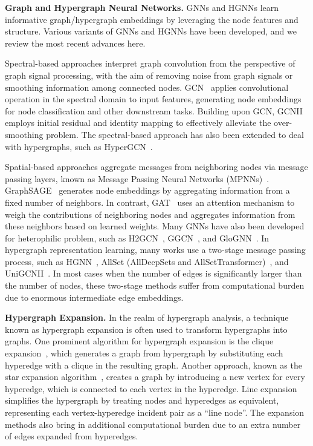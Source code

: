 \documentclass[review]{elsarticle}
\begin{document}
\textbf{Graph and Hypergraph Neural Networks.} GNNs and HGNNs learn informative graph/hypergraph embeddings by leveraging the node features and structure. Various variants of GNNs and HGNNs have been developed, and we review the most recent advances here.

Spectral-based approaches interpret graph convolution from the perspective of graph signal processing, with the aim of removing noise from graph signals or smoothing information among connected nodes. GCN~\cite{kipf2016semi} applies convolutional operation in the spectral domain to input features, generating node embeddings for node classification and other downstream tasks. Building upon GCN, GCNII~\cite{chen2020simple} employs initial residual and identity mapping to effectively alleviate the over-smoothing problem. The spectral-based approach has also been extended to deal with hypergraphs, such as HyperGCN~\cite{yadati2019hypergcn}.

Spatial-based approaches aggregate messages from neighboring nodes via message passing layers, known as Message Passing Neural Networks (MPNNs)~\cite{gilmer2017neural}. GraphSAGE~\cite{hamilton2017inductive} generates node embeddings by aggregating information from a fixed number of neighbors. In contrast, GAT~\cite{velickovic2017graph} uses an attention mechanism to weigh the contributions of neighboring nodes and aggregates information from these neighbors based on learned weights. Many GNNs have also been developed for heterophilic problem, such as H2GCN~\cite{zhu2020beyond}, GGCN~\cite{yan2022two}, and GloGNN~\cite{li2022finding}. In hypergraph representation learning, many works use a two-stage message passing process, such as HGNN~\cite{feng2019hypergraph}, AllSet (AllDeepSets and AllSetTransformer)~\cite{chien2021you}, and UniGCNII~\cite{huang2021unignn}. In most cases when the number of edges is significantly larger than the number of nodes, these two-stage methods suffer from computational burden due to enormous intermediate edge embeddings.

\textbf{Hypergraph Expansion.} In the realm of hypergraph analysis, a technique known as hypergraph expansion is often used to transform hypergraphs into graphs. One prominent algorithm for hypergraph expansion is the clique expansion~\cite{sun2008hypergraph}, which generates a graph from hypergraph by substituting each hyperedge with a clique in the resulting graph. Another approach, known as the star expansion algorithm~\cite{zien1999multilevel}, creates a graph by introducing a new vertex for every hyperedge, which is connected to each vertex in the hyperedge. Line expansion~\cite{yang2022semi} simplifies the hypergraph by treating nodes and hyperedges as equivalent, representing each vertex-hyperedge incident pair as a ``line node''. The expansion methods also bring in additional computational burden due to an extra number of edges expanded from hyperedges.
\end{document}
